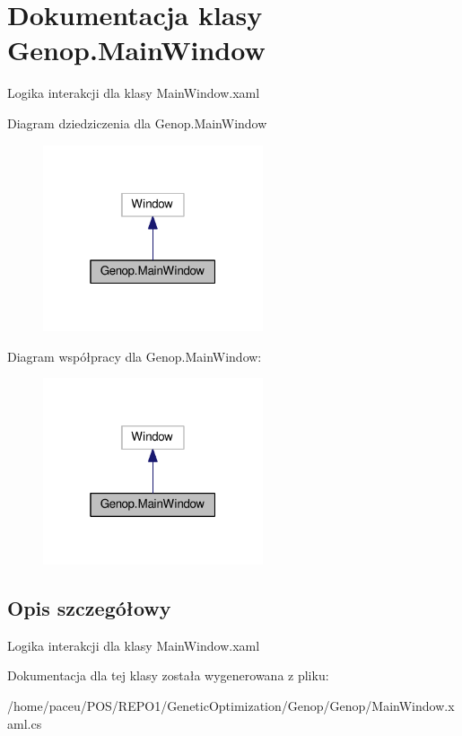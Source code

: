 \hypertarget{classGenop_1_1MainWindow}{}\section{Dokumentacja klasy Genop.\+Main\+Window}
\label{classGenop_1_1MainWindow}


Logika interakcji dla klasy Main\+Window.\+xaml  




Diagram dziedziczenia dla Genop.\+Main\+Window
\nopagebreak
\begin{figure}[H]
\begin{center}
\leavevmode
\includegraphics[width=184pt]{db/d3a/classGenop_1_1MainWindow__inherit__graph}
\end{center}
\end{figure}


Diagram współpracy dla Genop.\+Main\+Window\+:
\nopagebreak
\begin{figure}[H]
\begin{center}
\leavevmode
\includegraphics[width=184pt]{df/d6f/classGenop_1_1MainWindow__coll__graph}
\end{center}
\end{figure}


\subsection{Opis szczegółowy}
Logika interakcji dla klasy Main\+Window.\+xaml 



Dokumentacja dla tej klasy została wygenerowana z pliku\+:\begin{DoxyCompactItemize}
\item 
/home/paceu/\+P\+O\+S/\+R\+E\+P\+O1/\+Genetic\+Optimization/\+Genop/\+Genop/Main\+Window.\+xaml.\+cs\end{DoxyCompactItemize}
